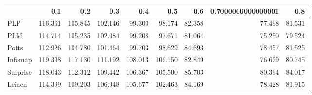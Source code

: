 \begin{tabular}{lrrrrrrrr}
\toprule
{} &     0.1 &     0.2 &     0.3 &     0.4 &     0.5 &    0.6 & 0.7000000000000001 &    0.8 \\
\midrule
PLP      & 116.361 & 105.845 & 102.146 &  99.300 &  98.174 & 82.358 &             77.498 & 81.531 \\
PLM      & 114.714 & 105.235 & 102.084 &  99.208 &  97.671 & 81.064 &             75.250 & 79.524 \\
Potts    & 112.926 & 104.780 & 101.464 &  99.703 &  98.629 & 84.693 &             78.457 & 81.525 \\
Infomap  & 119.398 & 117.130 & 111.192 & 108.013 & 106.150 & 82.849 &             76.629 & 80.745 \\
Surprise & 118.043 & 112.312 & 109.442 & 106.367 & 105.500 & 85.703 &             80.394 & 84.017 \\
Leiden   & 114.399 & 109.203 & 106.948 & 105.677 & 102.463 & 84.169 &             78.428 & 81.915 \\
\bottomrule
\end{tabular}
